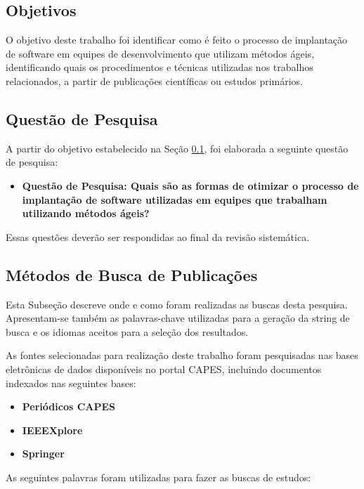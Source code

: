 \documentclass[12pt]{article}
\begin{document}
\subsection{Objetivos} \label{sec3:subsec1}

O objetivo deste trabalho foi identificar como é feito o processo de implantação de software em equipes de desenvolvimento que utilizam métodos ágeis, identificando quais os procedimentos e técnicas utilizadas nos trabalhos relacionados, a partir de publicações científicas ou estudos primários.

\subsection{Questão de Pesquisa} \label{sec3:subsec2}

A partir do objetivo estabelecido na Seção \ref{sec3:subsec1}, foi elaborada a seguinte questão de pesquisa:

 \begin{itemize}
   \item  \textbf{Questão de Pesquisa: Quais são as formas de otimizar o processo de implantação de software utilizadas em equipes que trabalham utilizando métodos ágeis? }
 \end{itemize}

Essas questões deverão ser respondidas ao final da revisão sistemática.

\subsection{Métodos de Busca de Publicações} \label{sec3:subsec3}

Esta  Subseção  descreve  onde  e  como  foram  realizadas
as  buscas  desta  pesquisa. Apresentam-se também as palavras-chave utilizadas para a geração da string  de busca e os idiomas aceitos para a seleção dos resultados. 

As fontes selecionadas para realização deste trabalho foram pesquisadas nas bases eletrônicas de dados disponíveis no portal CAPES, incluindo documentos indexados nas seguintes bases:

 \begin{itemize}
   \item  \textbf{Periódicos CAPES}
   \item  \textbf{IEEEXplore}
   \item  \textbf{Springer}
 \end{itemize}
 
As seguintes palavras foram utilizadas para fazer as buscas de estudos:
\end{document}
